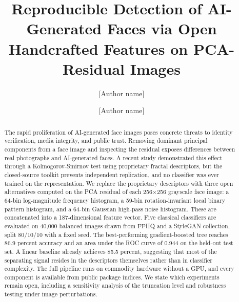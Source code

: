 \documentclass[runningheads]{llncs}
\begin{document}
\title{Reproducible Detection of AI-Generated Faces via Open Handcrafted Features on PCA-Residual Images}

\author{[Author name] \and [Author name]}
\authorrunning{[Author et al.]}

\maketitle

\begin{abstract}
The rapid proliferation of AI-generated face images poses concrete threats to identity verification, media integrity, and public trust. Removing dominant principal components from a face image and inspecting the residual exposes differences between real photographs and AI-generated faces. A recent study demonstrated this effect through a Kolmogorov-Smirnov test using proprietary fractal descriptors, but the closed-source toolkit prevents independent replication, and no classifier was ever trained on the representation. We replace the proprietary descriptors with three open alternatives computed on the PCA residual of each 256$\times$256 grayscale face image: a 64-bin log-magnitude frequency histogram, a 59-bin rotation-invariant local binary pattern histogram, and a 64-bin Gaussian high-pass noise histogram. These are concatenated into a 187-dimensional feature vector. Five classical classifiers are evaluated on 40,000 balanced images drawn from FFHQ and a StyleGAN collection, split 80/10/10 with a fixed seed. The best-performing gradient-boosted tree reaches 86.9 percent accuracy and an area under the ROC curve of 0.944 on the held-out test set. A linear baseline already achieves 85.5 percent, suggesting that most of the separating signal resides in the descriptors themselves rather than in classifier complexity. The full pipeline runs on commodity hardware without a GPU, and every component is available from public package indices. We state which experiments remain open, including a sensitivity analysis of the truncation level and robustness testing under image perturbations.

\end{abstract}


\end{document}

